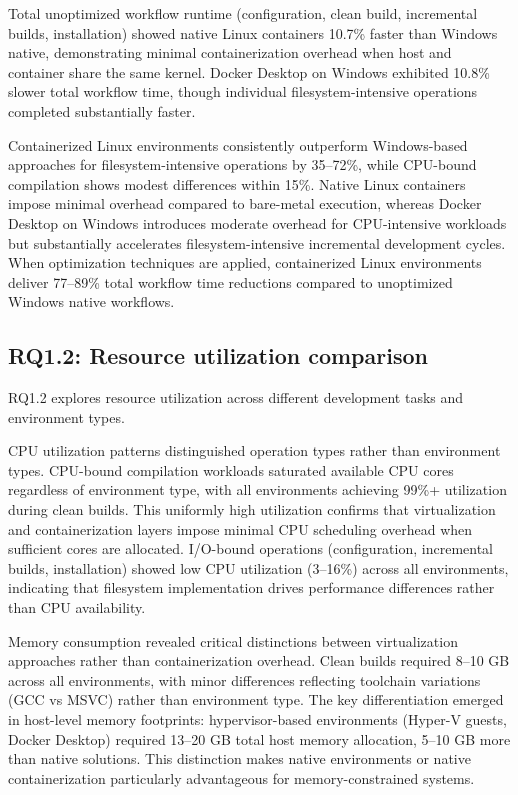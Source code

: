 Total unoptimized workflow runtime (configuration, clean build, incremental builds, installation) showed native Linux containers 10.7\% faster than Windows native, demonstrating minimal containerization overhead when host and container share the same kernel.
Docker Desktop on Windows exhibited 10.8\% slower total workflow time, though individual filesystem-intensive operations completed substantially faster.

Containerized Linux environments consistently outperform Windows-based approaches for filesystem-intensive operations by 35--72\%, while CPU-bound compilation shows modest differences within 15\%.
Native Linux containers impose minimal overhead compared to bare-metal execution, whereas Docker Desktop on Windows introduces moderate overhead for CPU-intensive workloads but substantially accelerates filesystem-intensive incremental development cycles.
When optimization techniques are applied, containerized Linux environments deliver 77--89\% total workflow time reductions compared to unoptimized Windows native workflows.

\subsection{RQ1.2: Resource utilization comparison}

RQ1.2 explores resource utilization across different development tasks and environment types.

CPU utilization patterns distinguished operation types rather than environment types.
CPU-bound compilation workloads saturated available CPU cores regardless of environment type, with all environments achieving 99\%+ utilization during clean builds.
This uniformly high utilization confirms that virtualization and containerization layers impose minimal CPU scheduling overhead when sufficient cores are allocated.
I/O-bound operations (configuration, incremental builds, installation) showed low CPU utilization (3--16\%) across all environments, indicating that filesystem implementation drives performance differences rather than CPU availability.

Memory consumption revealed critical distinctions between virtualization approaches rather than containerization overhead.
Clean builds required 8--10 GB across all environments, with minor differences reflecting toolchain variations (GCC vs MSVC) rather than environment type.
The key differentiation emerged in host-level memory footprints: hypervisor-based environments (Hyper-V guests, Docker Desktop) required 13--20 GB total host memory allocation, 5--10 GB more than native solutions.
This distinction makes native environments or native containerization particularly advantageous for memory-constrained systems.


